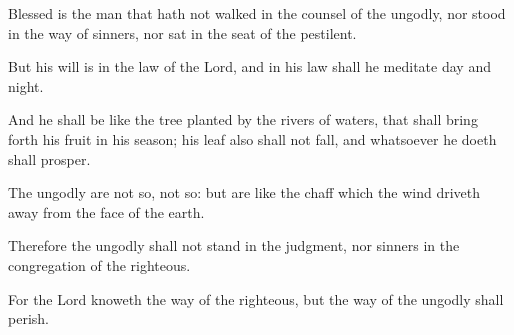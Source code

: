 Blessed is the man that hath not walked in the counsel of the ungodly, nor stood in the way of sinners, nor sat in the seat of the pestilent.

But his will is in the law of the Lord, and in his law shall he meditate day and night.

And he shall be like the tree planted by the rivers of waters, that shall bring forth his fruit in his season; his leaf also shall not fall, and whatsoever he doeth shall prosper.

The ungodly are not so, not so: but are like the chaff which the wind driveth away from the face of the earth.

Therefore the ungodly shall not stand in the judgment, nor sinners in the congregation of the righteous.

For the Lord knoweth the way of the righteous, but the way of the ungodly shall perish.
